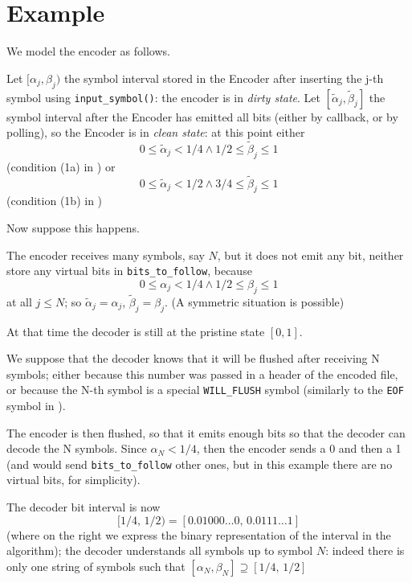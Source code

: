 \documentclass[a4paper,english]{article}
\begin{document}
\section{Example}

We model the encoder as follows.

Let $[\alpha_j,\beta_j)$ the symbol interval
stored in the Encoder after inserting  the j-th symbol using \texttt{input\_symbol()}:
the encoder is in \emph{dirty state}.
Let $[\tilde \alpha_j,\tilde \beta_j]$
the symbol interval after the Encoder has emitted all bits (either by callback, or by polling),
so the Encoder is in \emph{clean state}: at this point
either
\[ 0\le \tilde \alpha_j< 1/4 \land 1/2\le \tilde \beta_j\le 1\]
(condition (1a) in \cite{witten1987arithmetic})
or
\[0\le \tilde \alpha_j< 1/2 \land 3/4\le\tilde \beta_j\le 1\]
(condition (1b) in \cite{witten1987arithmetic})

Now suppose this happens.

The encoder receives many symbols, say $N$, but it does not emit any bit,
neither store any virtual bits in \texttt{bits\_to\_follow},
because
\[ 0\le \alpha_j< 1/4\land 1/2\le \beta_j\le 1\] at all $j\le N$;
so $\tilde\alpha_j=\alpha_j$, $\tilde\beta_j=\beta_j$.
(A symmetric situation is possible)

At that time the decoder is still at the pristine state $[0,1]$.

\smallskip

We suppose that the decoder knows that it will be flushed after receiving N symbols;
either because this number was passed in a header of the encoded
file, or because the N-th symbol is a special \texttt{WILL\_FLUSH} symbol
(similarly to the \texttt{EOF} symbol in  \cite{witten1987arithmetic}).

\smallskip

The encoder is then flushed, so that it emits enough bits so that the
decoder can decode the N symbols. Since $\alpha_N< 1/4$, then the
encoder sends a 0 and then a 1 (and would send
\texttt{bits\_to\_follow} other ones, but in this example there are no
virtual bits, for simplicity).

The decoder bit interval is now
\[ [1/4, \, 1/2) = [ 0.01000\ldots 0 , \, 0.0111\ldots 1] \]
(where on the right we express the binary representation of the interval in the algorithm);
the decoder understands all symbols up to symbol $N$:
indeed there is only one string of symbols such that $[\alpha_N,\beta_N]\supseteq [1/4,\, 1/2]$
\end{document}
